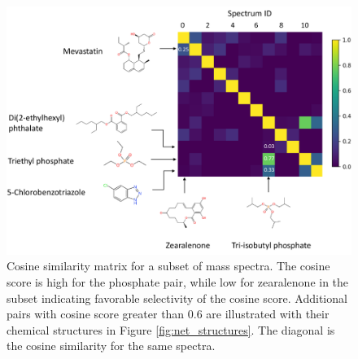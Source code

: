 \clearpage
\begin{figure}[h]
  \includegraphics[width=1\textwidth]{include/img/results/cosine_zoom_in.pdf}
  \caption{Cosine similarity matrix for a subset of mass spectra. The cosine score is high for the phosphate pair, while low for zearalenone in the subset indicating favorable selectivity of the cosine score. Additional pairs with cosine score greater than 0.6 are illustrated with their chemical structures in Figure \ref{fig:net_structures}. The diagonal is the cosine similarity for the same spectra. }
  \label{fig:cosine_zoomed_in}
\end{figure}


